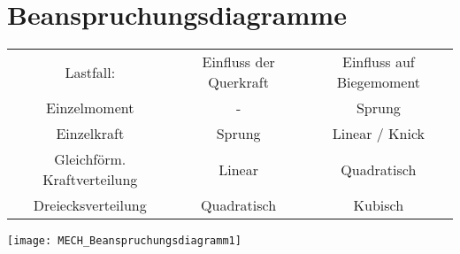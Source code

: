 \documentclass[numerate]{cheatsheet}
\begin{document}
    \section{Beanspruchungsdiagramme}
        \begin{scriptsize}
            \begin{center}
                \begin{tabular}{|c|c|c|}
                    \hline
                    \cellcolor{Salmon}Lastfall: & Einfluss der Querkraft & Einfluss auf Biegemoment\\
                    \hhline{|=|=|=|}
                    Einzelmoment & - & Sprung \\
                    \hline
                    Einzelkraft & Sprung & Linear / Knick\\
                    \hline
                    Gleichförm. Kraftverteilung & Linear & Quadratisch\\
                    \hline
                    Dreiecksverteilung & Quadratisch & Kubisch\\
                    \hline
                \end{tabular}
                \texttt{[image: MECH\_Beanspruchungsdiagramm1]}
            \end{center}    
        \end{scriptsize}    
    \cbreak    
\end{document}
